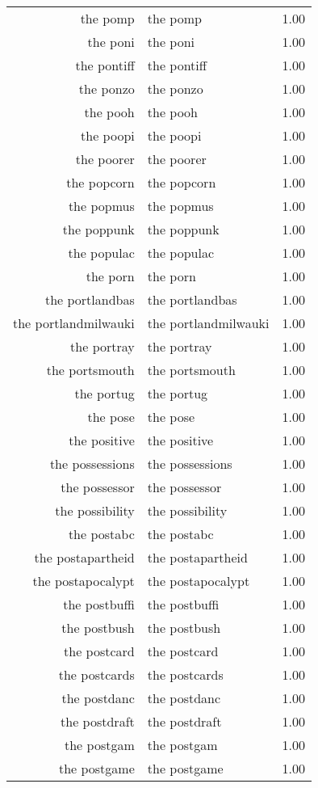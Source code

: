 \begin{table}[ht]
\begin{tabular}{rlr}
  the pomp & the pomp & 1.00 \\ 
  the poni & the poni & 1.00 \\ 
  the pontiff & the pontiff & 1.00 \\ 
  the ponzo & the ponzo & 1.00 \\ 
  the pooh & the pooh & 1.00 \\ 
  the poopi & the poopi & 1.00 \\ 
  the poorer & the poorer & 1.00 \\ 
  the popcorn & the popcorn & 1.00 \\ 
  the popmus & the popmus & 1.00 \\ 
  the poppunk & the poppunk & 1.00 \\ 
  the populac & the populac & 1.00 \\ 
  the porn & the porn & 1.00 \\ 
  the portlandbas & the portlandbas & 1.00 \\ 
  the portlandmilwauki & the portlandmilwauki & 1.00 \\ 
  the portray & the portray & 1.00 \\ 
  the portsmouth & the portsmouth & 1.00 \\ 
  the portug & the portug & 1.00 \\ 
  the pose & the pose & 1.00 \\ 
  the positive & the positive & 1.00 \\ 
  the possessions & the possessions & 1.00 \\ 
  the possessor & the possessor & 1.00 \\ 
  the possibility & the possibility & 1.00 \\ 
  the postabc & the postabc & 1.00 \\ 
  the postapartheid & the postapartheid & 1.00 \\ 
  the postapocalypt & the postapocalypt & 1.00 \\ 
  the postbuffi & the postbuffi & 1.00 \\ 
  the postbush & the postbush & 1.00 \\ 
  the postcard & the postcard & 1.00 \\ 
  the postcards & the postcards & 1.00 \\ 
  the postdanc & the postdanc & 1.00 \\ 
  the postdraft & the postdraft & 1.00 \\ 
  the postgam & the postgam & 1.00 \\ 
  the postgame & the postgame & 1.00 \\ 

\end{tabular}
\end{table}
